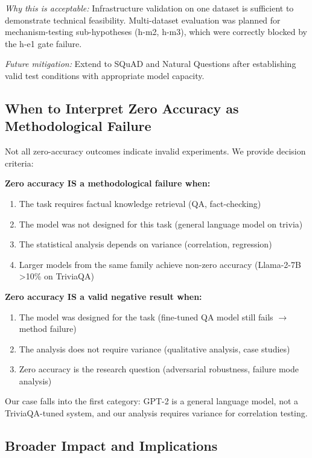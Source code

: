 \textit{Why this is acceptable:} Infrastructure validation on one dataset is sufficient to demonstrate technical feasibility. Multi-dataset evaluation was planned for mechanism-testing sub-hypotheses (h-m2, h-m3), which were correctly blocked by the h-e1 gate failure.

\textit{Future mitigation:} Extend to SQuAD and Natural Questions after establishing valid test conditions with appropriate model capacity.

\subsection{When to Interpret Zero Accuracy as Methodological Failure}

Not all zero-accuracy outcomes indicate invalid experiments. We provide decision criteria:

\textbf{Zero accuracy IS a methodological failure when:}
\begin{enumerate}
\item The task requires factual knowledge retrieval (QA, fact-checking)
\item The model was not designed for this task (general language model on trivia)
\item The statistical analysis depends on variance (correlation, regression)
\item Larger models from the same family achieve non-zero accuracy (Llama-2-7B >10\% on TriviaQA)
\end{enumerate}

\textbf{Zero accuracy IS a valid negative result when:}
\begin{enumerate}
\item The model was designed for the task (fine-tuned QA model still fails $\rightarrow$ method failure)
\item The analysis does not require variance (qualitative analysis, case studies)
\item Zero accuracy is the research question (adversarial robustness, failure mode analysis)
\end{enumerate}

Our case falls into the first category: GPT-2 is a general language model, not a TriviaQA-tuned system, and our analysis requires variance for correlation testing.

\subsection{Broader Impact and Implications}

